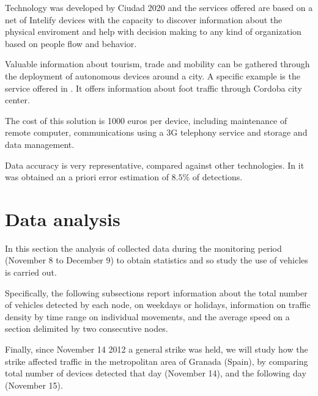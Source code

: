 \documentclass{llncs}
\begin{document}
Technology was developed by Ciudad 2020 and the services offered are based on a net of Intelify devices with the capacity to discover information about the physical enviroment and help with decision making to any kind of organization based on people flow and behavior.

Valuable information about tourism, trade and mobility can be gathered through the deployment of autonomous devices around a city. A specific example is the service offered in \cite{numerodepersonas}. It offers information about foot traffic through Cordoba city center.

The cost of this solution is 1000 euros per device, including maintenance of remote computer, communications using a 3G telephony service and storage and data management.

Data accuracy is very representative, compared against other technologies.
In \cite{estudioprecision} it was obtained an a priori error estimation of $8.5\%$ of detections.




\section{Data analysis}
\label{analisis}


In this section the analysis of collected data during the monitoring period (November 8 to December 9) to obtain statistics and so study the use of vehicles is carried out.

Specifically, the following subsections report information about the total number of vehicles detected by each node, on weekdays or holidays, information on traffic density by time range on individual movements, and the average speed on a section delimited by two consecutive nodes.

Finally, since November 14 2012 a general strike was held, we will study how the strike affected traffic in the metropolitan area of Granada (Spain), by comparing total number of devices detected that day (November 14), and the following day (November 15).
\end{document}
